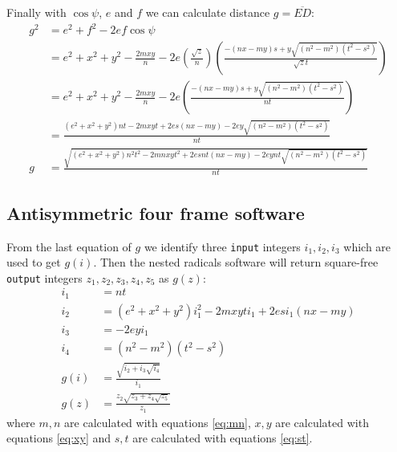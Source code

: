 \documentclass[11pt]{article}
\begin{document}
Finally with $\cos\psi$, $e$ and $f$ we can calculate distance $g = \overline{ED}$:
\begin{align}
g^2 &= e^2 + f^2 - 2ef\cos\psi\\
 &= e^2 + x^2 + y^2 - \frac{2mxy}{n} 
 - 2e\left(\frac{\sqrt{z}}n\right)\left(\frac{-(nx - my)s + y\sqrt{(n^2 - m^2)(t^2-s^2)}}{\sqrt{z}t}\right)\\
 &= e^2 + x^2 + y^2 - \frac{2mxy}{n} 
 - 2e\left(\frac{-(nx - my)s + y\sqrt{(n^2 - m^2)(t^2-s^2)}}{nt}\right)\\
 &= \frac{
  (e^2 + x^2 + y^2)nt - 2mxyt + 2es(nx - my) - 2ey\sqrt{(n^2 - m^2)(t^2-s^2)}
 }{nt}\nonumber\\
g &= \frac{\sqrt{
(e^2 + x^2 + y^2)n^2t^2 - 2mnxyt^2 + 2esnt(nx - my) - 2eynt\sqrt{(n^2 - m^2)(t^2-s^2)}
}}{nt}
\end{align}

\subsection{Antisymmetric four frame software}

From the last equation of $g$ we identify three \texttt{input} integers $i_1,i_2,i_3$ which are used to get $g(i)$. Then the nested radicals software will return square-free \texttt{output} integers $z_1,z_2,z_3,z_4,z_5$ as $g(z)$:
\begin{align}
i_1 &= nt\\
i_2 &= (e^2 + x^2 + y^2)i_1^2 - 2mxyti_1 + 2esi_1(nx - my)\\
i_3 &= - 2eyi_1\\
i_4 &= (n^2 - m^2)(t^2-s^2)\\
g(i) &= \frac{\sqrt{i_2+i_3\sqrt{i_4}}}{i_1}\\
g(z) &= \frac{z_2\sqrt{z_3+z_4\sqrt{z_5}}}{z_1}
\end{align}
where $m,n$ are calculated with equations \ref{eq:mn}, $x,y$ are calculated with equations \ref{eq:xy} and $s,t$ are calculated with equations \ref{eq:st}.
\end{document}
